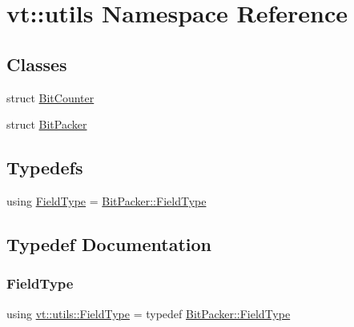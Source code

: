 \hypertarget{namespacevt_1_1utils}{}\section{vt\+:\+:utils Namespace Reference}
\label{namespacevt_1_1utils}
\subsection*{Classes}
\begin{DoxyCompactItemize}
\item 
struct \hyperlink{structvt_1_1utils_1_1_bit_counter}{Bit\+Counter}
\item 
struct \hyperlink{structvt_1_1utils_1_1_bit_packer}{Bit\+Packer}
\end{DoxyCompactItemize}
\subsection*{Typedefs}
\begin{DoxyCompactItemize}
\item 
using \hyperlink{namespacevt_1_1utils_a83bf4339dd1250f9880b6d4603320d39}{Field\+Type} = \hyperlink{structvt_1_1utils_1_1_bit_packer_a23024285425933c1f10c8fc3942f9beb}{Bit\+Packer\+::\+Field\+Type}
\end{DoxyCompactItemize}


\subsection{Typedef Documentation}
\mbox{\label{namespacevt_1_1utils_a83bf4339dd1250f9880b6d4603320d39}} 
\subsubsection{\texorpdfstring{Field\+Type}{FieldType}}
{\footnotesize\ttfamily using \hyperlink{namespacevt_1_1utils_a83bf4339dd1250f9880b6d4603320d39}{vt\+::utils\+::\+Field\+Type} = typedef \hyperlink{structvt_1_1utils_1_1_bit_packer_a23024285425933c1f10c8fc3942f9beb}{Bit\+Packer\+::\+Field\+Type}}

